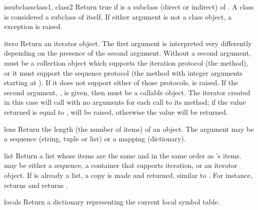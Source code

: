 \begin{funcdesc}{issubclass}{class1, class2}
  Return true if  is a subclass (direct or indirect) of
  .  A class is considered a subclass of itself.  If
  either argument is not a class object, a 
  exception is raised.
\end{funcdesc}

\begin{funcdesc}{iter}{o}
  Return an iterator object.  The first argument is interpreted very
  differently depending on the presence of the second argument.
  Without a second argument,  must be a collection object which
  supports the iteration protocol (the  method), or
  it must support the sequence protocol (the 
  method with integer arguments starting at ).  If it does not
  support either of those protocols,  is raised.
  If the second argument, , is given, then  must
  be a callable object.  The iterator created in this case will call
   with no arguments for each call to its 
  method; if the value returned is equal to ,
   will be raised, otherwise the value will
  be returned.
\end{funcdesc}

\begin{funcdesc}{len}{s}
  Return the length (the number of items) of an object.  The argument
  may be a sequence (string, tuple or list) or a mapping (dictionary).
\end{funcdesc}

\begin{funcdesc}{list}{}
  Return a list whose items are the same and in the same order as
  's items.   may be either a sequence, a
  container that supports iteration, or an iterator object.  If
   is already a list, a copy is made and returned,
  similar to .  For instance,
   returns \code{['a', 'b', 'c']} and  returns \code{[1, 2, 3]}.
\end{funcdesc}

\begin{funcdesc}{locals}{}
  Return a dictionary representing the current local symbol table.
\end{funcdesc}

